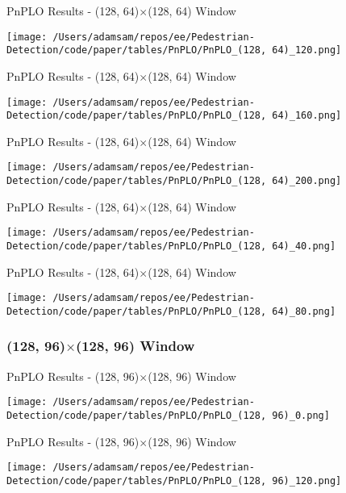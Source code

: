 \begin{table}
    \caption{PnPLO Results - (128, 64)$\times$(128, 64) Window}
    \texttt{[image: /Users/adamsam/repos/ee/Pedestrian-Detection/code/paper/tables/PnPLO/PnPLO\_(128, 64)\_120.png]}
    \label{tab:PnPLO_(128, 64)_120}
\end{table}

\begin{table}
    \caption{PnPLO Results - (128, 64)$\times$(128, 64) Window}
    \texttt{[image: /Users/adamsam/repos/ee/Pedestrian-Detection/code/paper/tables/PnPLO/PnPLO\_(128, 64)\_160.png]}
    \label{tab:PnPLO_(128, 64)_160}
\end{table}

\begin{table}
    \caption{PnPLO Results - (128, 64)$\times$(128, 64) Window}
    \texttt{[image: /Users/adamsam/repos/ee/Pedestrian-Detection/code/paper/tables/PnPLO/PnPLO\_(128, 64)\_200.png]}
    \label{tab:PnPLO_(128, 64)_200}
\end{table}

\begin{table}
    \caption{PnPLO Results - (128, 64)$\times$(128, 64) Window}
    \texttt{[image: /Users/adamsam/repos/ee/Pedestrian-Detection/code/paper/tables/PnPLO/PnPLO\_(128, 64)\_40.png]}
    \label{tab:PnPLO_(128, 64)_40}
\end{table}

\begin{table}
    \caption{PnPLO Results - (128, 64)$\times$(128, 64) Window}
    \texttt{[image: /Users/adamsam/repos/ee/Pedestrian-Detection/code/paper/tables/PnPLO/PnPLO\_(128, 64)\_80.png]}
    \label{tab:PnPLO_(128, 64)_80}
\end{table}

\subsubsection*{(128, 96)$\times$(128, 96) Window}

\begin{table}
    \caption{PnPLO Results - (128, 96)$\times$(128, 96) Window}
    \texttt{[image: /Users/adamsam/repos/ee/Pedestrian-Detection/code/paper/tables/PnPLO/PnPLO\_(128, 96)\_0.png]}
    \label{tab:PnPLO_(128, 96)_0}
\end{table}

\begin{table}
    \caption{PnPLO Results - (128, 96)$\times$(128, 96) Window}
    \texttt{[image: /Users/adamsam/repos/ee/Pedestrian-Detection/code/paper/tables/PnPLO/PnPLO\_(128, 96)\_120.png]}
    \label{tab:PnPLO_(128, 96)_120}
\end{table}

